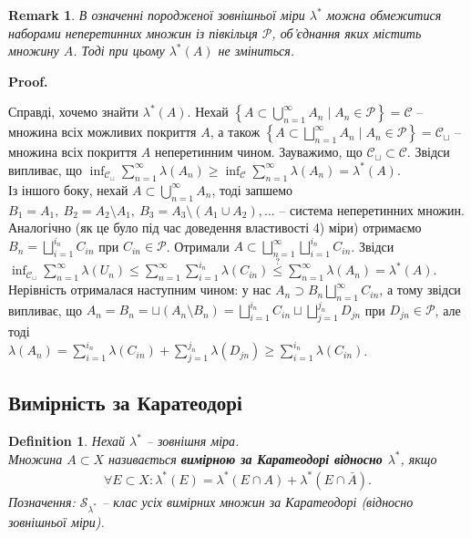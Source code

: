 \documentclass[a4paper, 10pt]{article}
\makeatletter
\theoremstyle{theoremdd}
\newtheorem{definition}[theorem]{Definition}
\newtheorem{remark}[theorem]{Remark}
\renewenvironment{proof}[1][Proof.\\]{\par
\pushQED{\hfill \qed}%
\normalfont \topsep6\p@\@plus6\p@\relax
\trivlist
\item\relax
{\bfseries
#1\@addpunct{.}}\hspace\labelsep\ignorespaces
}{%
\popQED\endtrivlist\@endpefalse
}
\makeatother
\begin{document}
\begin{remark}
В означенні породженої зовнішньої міри $\lambda^*$ можна обмежитися наборами неперетинних множин із півкільця $\mathcal{P}$, об'єднання яких містить множину $A$. Тоді при цьому $\lambda^*(A)$ не зміниться.
\end{remark}

\begin{proof}
Справді, хочемо знайти $\lambda^*(A)$. Нехай $\left\{ A \subset \displaystyle\bigcup_{n=1}^\infty A_n \mid A_n \in \mathcal{P}\right\} = \mathcal{C}$ -- множина всіх можливих покриття $A$, а також $\left\{ A \subset \displaystyle\bigsqcup_{n=1}^\infty A_n \mid A_n \in \mathcal{P}\right\} = \mathcal{C}_\sqcup$ -- множина всіх покриття $A$ неперетинним чином. Зауважимо, що $\mathcal{C}_{\sqcup} \subset \mathcal{C}$. Звідси випливає, що $\displaystyle\inf_{\mathcal{C}_{\sqcup}} \sum_{n=1}^\infty \lambda(A_n) \geq \displaystyle\inf_{\mathcal{C}} \sum_{n=1}^\infty \lambda(A_n) =\lambda^*(A)$.\\
Із іншого боку, нехай $A \subset \displaystyle\bigcup_{n=1}^\infty A_n$, тоді запшемо $B_1 = A_1,\ B_2 = A_2 \setminus A_1,\ B_3 = A_3 \setminus (A_1 \cup A_2), \dots$ -- система неперетинних множин. Аналогічно (як це було під час доведення властивості 4) міри) отримаємо $B_n = \displaystyle\bigsqcup_{i=1}^{i_n} C_{in}$ при $C_{in} \in \mathcal{P}$. Отримали $\displaystyle A \subset \bigsqcup_{n=1}^{\infty} \bigsqcup_{i=1}^{i_n} C_{in}$. Звідси\\
$\displaystyle\inf_{\mathcal{C}_{\sqcup}} \sum_{n=1}^\infty \lambda(U_n) \leq \sum_{n=1}^\infty \sum_{i=1}^{i_n} \lambda(C_{in}) \overset{?}{\leq} \sum_{n=1}^\infty \lambda(A_n) = \lambda^*(A)$.\\
Нерівність отрималася наступним чином: у нас $A_n \supset B_n \displaystyle\bigsqcup_{n=1}^\infty C_{in}$, а тому звідси випливає, що $\displaystyle A_n = B_n = \sqcup (A_n \setminus B_n) = \bigsqcup_{i=1}^{i_n} C_{in} \sqcup \bigsqcup_{j=1}^{j_n} D_{jn}$ при $D_{jn} \in \mathcal{P}$, але тоді\\
$\lambda(A_n) = \displaystyle\sum_{i=1}^{i_n} \lambda(C_{in}) + \sum_{j=1}^{j_n} \lambda(D_{jn}) \geq \sum_{i=1}^{i_n} \lambda(C_{in})$.
\end{proof}

\subsection{Вимірність за Каратеодорі}
\begin{definition}
Нехай $\lambda^*$ -- зовнішня міра.\\
Множина $A \subset X$ називається \textbf{вимірною за Каратеодорі відносно $\lambda^*$}, якщо
\begin{align*}
\forall E \subset X: \lambda^*(E) = \lambda^*(E \cap A) + \lambda^*(E \cap \bar{A}).
\end{align*}
Позначення: $\mathcal{S}_{\lambda^*}$ -- клас усіх вимірних множин за Каратеодорі (відносно зовнішньої міри).
\end{definition}
\end{document}
